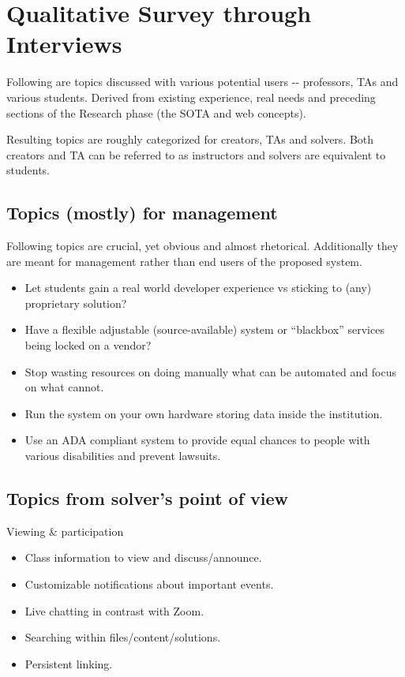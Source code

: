 \section{Qualitative Survey through Interviews} \label{sec:qualitative}

{Following are topics discussed with various potential users -\/- professors, TAs and various students. Derived from existing experience, real needs and preceding sections of the Research phase (the SOTA and web concepts).}

{Resulting topics are roughly categorized for creators, TAs and solvers. Both creators and TA can be referred to as instructors and solvers are equivalent to students.}

\subsection{Topics (mostly) for management} \label{ssec:management}

{Following topics are crucial, yet obvious and almost rhetorical. Additionally they are meant for management rather than end users of the proposed system.}

\begin{itemize}
\item
  {Let students gain a real world developer experience vs sticking to (any) proprietary solution?}
\item
  {Have a flexible adjustable (source-available) system or ``blackbox'' services being locked on a vendor?}
\item
  {Stop wasting resources on doing manually what can be automated and focus on what cannot.}
\item
  {Run the system on your own hardware storing data inside the institution.}
\item
  {Use an ADA compliant system to provide equal chances to people with various disabilities and prevent lawsuits.}
\end{itemize}

\subsection{Topics from solver's point of view} \label{ssec:solver}

{Viewing \& participation}

\begin{itemize}
\item
  {Class information to view and discuss/announce.}
\item
  {Customizable notifications about important events.}
\item
  {Live chatting in contrast with Zoom.}
\item
  {Searching within files/content/solutions.}
\item
  {Persistent linking.}
\end{itemize}

